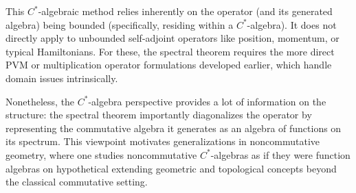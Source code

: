 This $C^*$-algebraic method relies inherently on the operator (and its generated algebra) being bounded (specifically, residing within a $C^*$-algebra). It does not directly apply to unbounded self-adjoint operators like position, momentum, or typical Hamiltonians. For these, the spectral theorem requires the more direct PVM or multiplication operator formulations developed earlier, which handle domain issues intrinsically.

Nonetheless, the $C^*$-algebra perspective provides a lot of information on the structure: the spectral theorem importantly diagonalizes the operator by representing the commutative algebra it generates as an algebra of functions on its spectrum. This viewpoint motivates generalizations in noncommutative geometry, where one studies noncommutative $C^*$-algebras as if they were function algebras on hypothetical  extending geometric and topological concepts beyond the classical commutative setting.
